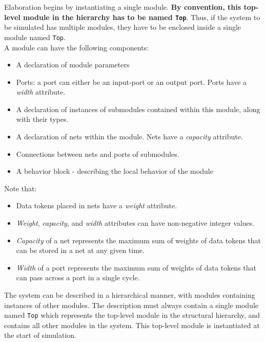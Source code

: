 \documentclass[12pt,a4paper]{report}
\begin{document}
	Elaboration begins by instantiating a single module.  \textbf{By
	convention, this top-level module in the hierarchy has to be named
	\texttt{Top}}.  Thus, if the system to be simulated has multiple
	modules, they have to be enclosed inside a single module named \texttt{Top}.\\

	A module can have the following components:
	\begin{itemize}
	\item A declaration of module parameters
	\item Ports: a port can either be an input-port or an output port.
	Ports have a \emph{width} attribute.
	\item A declaration of instances of submodules contained within this module, along with their types.
	\item A declaration of nets within the module. Nets have a \emph{capacity} attribute.
	\item Connections between nets and ports of submodules.
	\item A behavior block -  describing the local behavior of the module
	\end{itemize}
	
	Note that:
	{\renewcommand{\labelitemi}{$\triangleright$}
	\begin{itemize}
	\item Data tokens placed in nets have a \emph{weight} attribute. 
	\item \emph{Weight}, \emph{capacity}, and \emph{width} attributes can have non-negative integer values.
	\item \emph{Capacity} of a net represents the maximum 
	sum of weights of data tokens that can be stored in a net at any given time.
	\item \emph{Width} of a port represents the maximum sum of weights of data tokens that can pass across
	a port in a single cycle.
	\end{itemize}}



\item The system can be described in a hierarchical manner, 
with modules containing instances of other modules.  
The description must always contain a single module named
{\tt Top} which represents the top-level module in the structural
hierarchy, and contains all other modules in the system.  
This top-level module is instantiated at the start of simulation.
\end{document}
